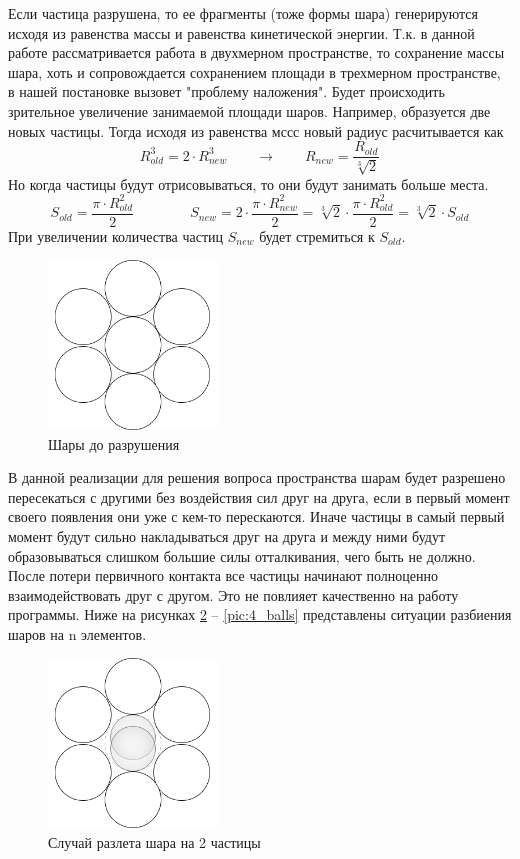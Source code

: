 \documentclass[utf8x, 14pt, oneside, a4paper]{article}
\begin{document}
Если частица разрушена, то ее фрагменты (тоже формы шара) генерируются исходя из равенства массы и равенства кинетической энергии. 
Т.к. в данной работе рассматривается работа в двухмерном пространстве, то сохранение массы шара, хоть и сопровождается сохранением площади в трехмерном пространстве, в нашей постановке вызовет "проблему наложения". 
Будет происходить зрительное увеличение занимаемой площади шаров.
Например, образуется две новых частицы.
Тогда исходя из равенства мссс новый радиус расчитывается как
\begin{equation*}
R_{old}^3 = 2 \cdot R^3_{new} \qquad \rightarrow \qquad R_{new} =\frac{R_{old}}{\sqrt[3]{2}}
\end{equation*}
Но когда частицы будут отрисовываться, то они будут занимать больше места.
\begin{equation*}
S_{old} = \frac{\pi \cdot R_{old}^2}{2} \qquad \qquad S_{new} = 2 \cdot \frac{\pi \cdot R_{new}^2}{2} = \sqrt[3]{2} \cdot \frac{\pi \cdot R_{old}^2}{2} = \sqrt[3]{2} \cdot S_{old}
\end{equation*}
При увеличении количества частиц $S_{new}$ будет стремиться к $S_{old}$.
\begin{figure}[H]
	\centering
	\includegraphics[width=0.4\textwidth]{1_balls} 
	\caption{Шары до разрушения}
	\label{pic:1_balls}
\end{figure} 
В данной реализации для решения вопроса пространства шарам будет разрешено пересекаться с другими без воздействия сил друг на друга, если в первый момент своего появления они уже с кем-то перескаются.
Иначе частицы в самый первый момент будут сильно накладываться друг на друга и между ними будут образовываться слишком большие силы отталкивания, чего быть не должно.
После потери первичного контакта все частицы начинают полноценно взаимодействовать друг с другом.
Это не повлияет качественно на работу программы.
Ниже на рисунках \ref{pic:2_balls} -- \ref{pic:4_balls} представлены ситуации разбиения шаров на n элементов.
\begin{figure}[H]
	\centering
	\includegraphics[width=0.4\textwidth]{2_balls} 
	\caption{Случай разлета шара на 2 частицы}
	\label{pic:2_balls}
\end{figure} 
\end{document}
